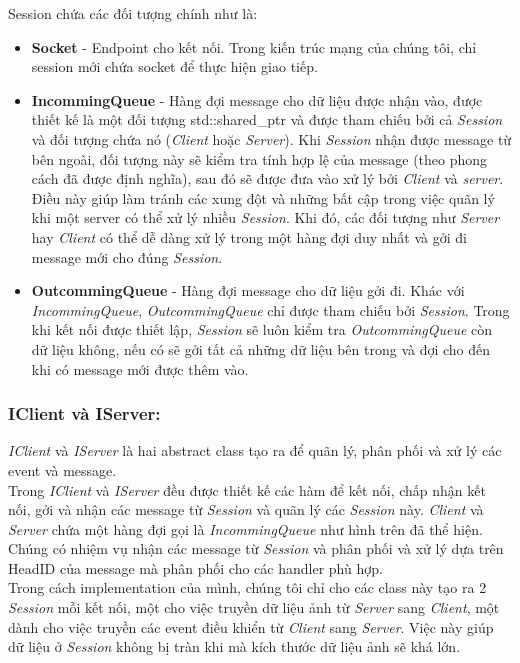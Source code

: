 Session chứa các đối tượng chính như là: 
\begin{itemize}
	\item \textbf{Socket} - Endpoint cho kết nối. Trong kiến trúc mạng của chúng tôi, chỉ session mới chứa socket để thực hiện giao tiếp.
	\item \textbf{IncommingQueue} - Hàng đợi message cho dữ liệu được nhận vào, được thiết kế là một đối tượng std::shared\_ptr và được tham chiếu bởi cả \textit{Session} và đối tượng chứa nó (\textit{Client} hoặc \textit{Server}). Khi \textit{Session} nhận được message từ bên ngoài, đối tượng này sẽ kiểm tra tính hợp lệ của message (theo phong cách đã được định nghĩa), sau đó sẽ được đưa vào xử lý bởi \textit{Client} và \textit{server}. Điều này giúp làm tránh các xung đột và những bất cập trong việc quãn lý khi một server có thể xử lý nhiều \textit{Session}. Khi đó, các đối tượng như \textit{Server} hay \textit{Client} có thể dễ dàng xử lý trong một hàng đợi duy nhất và gởi đi message mới cho đúng \textit{Session}.
	\item \textbf{OutcommingQueue} - Hàng đợi message cho dữ liệu gởi đi. Khác với \textit{IncommingQueue}, \textit{OutcommingQueue} chỉ được tham chiếu bởi \textit{Session}. Trong khi kết nối được thiết lập, \textit{Session} sẽ luôn kiểm tra \textit{OutcommingQueue} còn dữ liệu không, nếu có sẽ gởi tất cả những dữ liệu bên trong và đợi cho đến khi có message mới được thêm vào.
\end{itemize}

\subsubsection{IClient và IServer: }
\textit{IClient} và \textit{IServer} là hai abstract class tạo ra để quãn lý, phân phối và xử lý các event và message.  \\
Trong \textit{IClient} và \textit{IServer} đều được thiết kế các hàm để kết nối, chấp nhận kết nối, gởi và nhận các message từ \textit{Session} và quãn lý các \textit{Session} này. \textit{Client} và \textit{Server} chứa một hàng đợi gọi là \textit{IncommingQueue} như hình trên đã thể hiện. Chúng có nhiệm vụ nhận các message từ \textit{Session} và phân phối và xử lý dựa trên HeadID của message mà phân phối cho các handler phù hợp. \\
Trong cách implementation của mình, chúng tôi chỉ cho các class này tạo ra 2 \textit{Session} mỗi kết nối, một cho việc truyền dữ liệu ảnh từ \textit{Server} sang \textit{Client}, một dành cho việc truyền các event điều khiển từ \textit{Client} sang \textit{Server}. Việc này giúp dữ liệu ở \textit{Session} không bị tràn khi mà kích thước dữ liệu ảnh sẽ khá lớn. 


